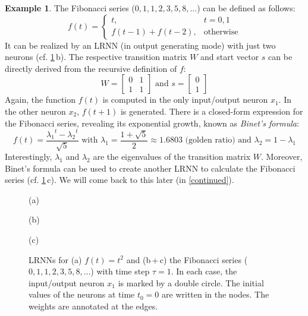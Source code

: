 \documentclass[preprint,12pt,times,authoryear]{elsarticle}%
\theoremstyle{definition}
\newtheorem{exmp}{Example}
\begin{document}
\begin{exmp}\label{fibonacci}
The Fibonacci series ($0,1,1,2,3,5,8,\dots$) can be defined as follows:
\[ f(t) = \left\{ \begin{array}{ll}
	t, & t=0,1\\
	f(t-1)+f(t-2), & \text{otherwise}
\end{array} \right. \]
It can be realized by an LRNN (in output generating mode) with just two neurons
(cf. \cref{examples}\,b). The respective transition matrix $W$ and start vector
$s$ can be directly derived from the recursive definition of $f$:
\[ W = \left[ \begin{array}{cc}
	0 & 1\\
	1 & 1
   \end{array} \right]
   \text{~and~} s = \left[ \begin{array}{c}
	0\\
	1
   \end{array} \right]
\]
Again, the function $f(t)$ is computed in the only input/output neuron $x_1$. In
the other neuron $x_2$, $f(t+1)$ is generated. There is a closed-form expression
for the Fibonacci series, revealing its exponential growth, known as
\emph{Binet's formula}:
\begin{equation}\label{binet}
   f(t) = \frac{{\lambda_1}^t-{\lambda_2}^t}{\sqrt{5}}
	\text{~with~} \lambda_1 = \displaystyle\frac{1+\sqrt{5}}{2} \approx 1.6803
	\text{~(golden ratio) and~} \lambda_2 = 1-\lambda_1
\end{equation}
Interestingly, $\lambda_1$ and $\lambda_2$ are the eigenvalues of the transition
matrix $W$. Moreover, Binet's formula can be used to create another LRNN to
calculate the Fibonacci series (cf. \cref{examples}\,c). We will come back to
this later (in \cref{continued}).
\end{exmp}

\begin{figure}
  \begin{minipage}[t]{0.3\textwidth}
	(a) 
  \end{minipage}
	\hfill
  \begin{minipage}[t]{0.3\textwidth}
	(b) 
  \end{minipage}
	\hfill
  \begin{minipage}[t]{0.34\textwidth}
	(c) 
  \end{minipage}
  \caption{LRNNs for (a) $f(t) = t^2$ and (b\,+\,c) the Fibonacci series
	($0,1,1,2,3,5,8,\dots$) with time step $\tau=1$. In each case, the input/output neuron
	$x_1$ is marked by a double circle. The initial values of the neurons at
	time $t_0=0$ are written in the nodes. The weights are annotated at the
	edges.}
  \label{examples}
\end{figure}
\end{document}
